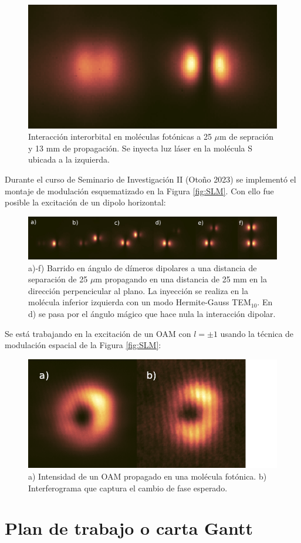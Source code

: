 \documentclass{article}
\begin{document}
\begin{figure}[H]
	\centering
	\includegraphics[width=0.5\linewidth]{./media/SPinteraction.png}
	\caption{Interacción interorbital en moléculas fotónicas a 25 $\mu$m de sepración y 13 mm de propagación. Se inyecta luz láser en la molécula S ubicada a la izquierda.}
\end{figure}

Durante el curso de Seminario de Investigación II (Otoño 2023) se implementó el montaje de modulación esquematizado en la Figura \ref{fig:SLM}. Con ello fue posible la excitación de un dipolo horizontal:

\begin{figure}[H]
	\centering
	\includegraphics[width=1.0\linewidth]{./media/dipoles.jpg}
	\caption{a)-f) Barrido en ángulo de dímeros dipolares a una distancia de separación de 25 $\mu$m propagando en una distancia de 25 mm en la dirección perpencicular al plano. La inyección se realiza en la molécula inferior izquierda con un modo Hermite-Gauss TEM$_{10}$. En d) se pasa por el ángulo mágico que hace nula la interacción dipolar.}
\end{figure}

Se está trabajando en la excitación de un OAM con $l = \pm 1$ usando la técnica de modulación espacial de la Figura \ref{fig:SLM}:

\begin{figure}[H]
	\centering
	\includegraphics[width=0.7\linewidth]{./media/vortex.png}
	\caption{a) Intensidad de un OAM propagado en una molécula fotónica. b) Interferograma que captura el cambio de fase esperado.}
\end{figure} 

\section{Plan de trabajo o carta Gantt}


\renewcommand\refname{Referencias}


\end{document}
